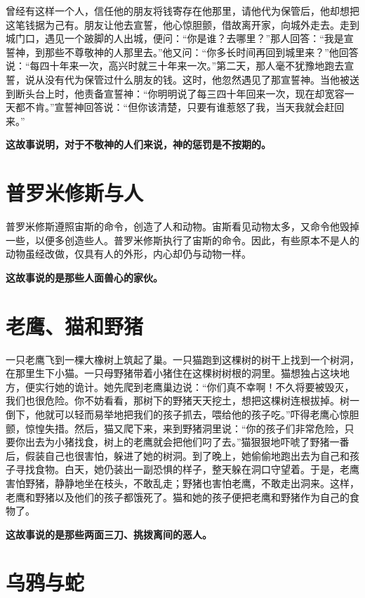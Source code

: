 曾经有这样一个人，信任他的朋友将钱寄存在他那里，请他代为保管后，他却想把这笔钱据为己有。朋友让他去宣誓，他心惊胆颤，借故离开家，向城外走去。走到城门口，遇见一个跛脚的人出城，便问：“你是谁？去哪里？”那人回答：“我是宣誓神，到那些不尊敬神的人那里去。”他又问：“你多长时间再回到城里来？”他回答说：“每四十年来一次，高兴时就三十年来一次。”第二天，那人毫不犹豫地跑去宣誓，说从没有代为保管过什么朋友的钱。这时，他忽然遇见了那宣誓神。当他被送到断头台上时，他责备宣誓神：“你明明说了每三四十年回来一次，现在却宽容一天都不肯。”宣誓神回答说：“但你该清楚，只要有谁惹怒了我，当天我就会赶回来。”

{\bfseries \color{red}这故事说明，对于不敬神的人们来说，神的惩罚是不按期的。}

\section{普罗米修斯与人}

普罗米修斯遵照宙斯的命令，创造了人和动物。宙斯看见动物太多，又命令他毁掉一些，以便多创造些人。普罗米修斯执行了宙斯的命令。因此，有些原本不是人的动物虽经改做，仅具有人的外形，内心却仍与动物一样。

{\bfseries \color{red}这故事说的是那些人面兽心的家伙。}

\section{老鹰、猫和野猪}

一只老鹰飞到一棵大橡树上筑起了巢。一只猫跑到这棵树的树干上找到一个树洞，在那里生下小猫。一只母野猪带着小猪住在这棵树树根的洞里。猫想独占这块地方，便实行她的诡计。她先爬到老鹰巢边说：“你们真不幸啊！不久将要被毁灭，我们也很危险。你不妨看看，那树下的野猪天天挖土，想把这棵树连根拔掉。树一倒下，他就可以轻而易举地把我们的孩子抓去，喂给他的孩子吃。”吓得老鹰心惊胆颤，惊惶失措。然后，猫又爬下来，来到野猪洞里说：“你的孩子们非常危险，只要你出去为小猪找食，树上的老鹰就会把他们叼了去。”猫狠狠地吓唬了野猪一番后，假装自己也很害怕，躲进了她的树洞。到了晚上，她偷偷地跑出去为自己和孩子寻找食物。白天，她仍装出一副恐惧的样子，整天躲在洞口守望着。于是，老鹰害怕野猪，静静地坐在枝头，不敢乱走；野猪也害怕老鹰，不敢走出洞来。这样，老鹰和野猪以及他们的孩子都饿死了。猫和她的孩子便把老鹰和野猪作为自己的食物了。

{\bfseries \color{red}这故事说的是那些两面三刀、挑拨离间的恶人。}

\section{乌鸦与蛇}

